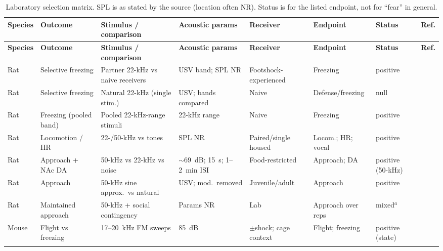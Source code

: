 \begin{landscape}
\begingroup
\footnotesize
\singlespacing
\setlength{\tabcolsep}{3pt}
\begin{longtable}{@{}p{0.85in}p{0.75in}p{1.35in}p{1.1in}p{0.95in}p{0.85in}p{0.55in}p{0.7in}@{}}
\caption{Laboratory selection matrix. SPL is as stated by the source (location often NR). Status is for the listed endpoint, not for ``fear'' in general.}\label{tab:practical-lab}\\
\toprule
\textbf{Species} & \textbf{Outcome} & \textbf{Stimulus / comparison} & \textbf{Acoustic params} & \textbf{Receiver} & \textbf{Endpoint} & \textbf{Status} & \textbf{Ref.} \\
\midrule
\endfirsthead
\toprule
\textbf{Species} & \textbf{Outcome} & \textbf{Stimulus / comparison} & \textbf{Acoustic params} & \textbf{Receiver} & \textbf{Endpoint} & \textbf{Status} & \textbf{Ref.} \\
\midrule
\endhead
\bottomrule
\endlastfoot
Rat & Selective freezing & Partner 22-kHz vs naive receivers & USV band; SPL NR & Footshock-experienced & Freezing & positive & \citet{KimEtAl2010} \\ \addlinespace[2pt]
Rat & Selective freezing & Natural 22-kHz (single stim.) & USV; bands compared & Naive & Defense/freezing & null & \citet{EndresEtAl2007} \\ \addlinespace[2pt]
Rat & Freezing (pooled band) & Pooled 22-kHz-range stimuli & 22-kHz range & Naive & Freezing & positive & \citet{EndresEtAl2007} \\ \addlinespace[2pt]
Rat & Locomotion / HR & 22-/50-kHz vs tones & SPL NR & Paired/single housed & Locom.; HR; vocal & positive & \citet{OlszynskiEtAl2020} \\ \addlinespace[2pt]
Rat & Approach + NAc DA & 50-kHz vs 22-kHz vs noise & $\sim$69~dB; 15~s; 1--2~min ISI & Food-restricted & Approach; DA & positive (50-kHz) & \citet{WilluhnEtAl2014} \\ \addlinespace[2pt]
Rat & Approach & 50-kHz sine approx.\ vs natural & USV; mod.\ removed & Juvenile/adult & Approach & positive & \citet{WohrSchwarting2007} \\ \addlinespace[2pt]
Rat & Maintained approach & 50-kHz + social contingency & Params NR & Lab & Approach over reps & mixed$^{a}$ & \citet{BerzEtAl2022} \\ \addlinespace[2pt]
Mouse & Flight vs freezing & 17--20~kHz FM sweeps & 85~dB & $\pm$shock; cage context & Flight; freezing & positive (state) & \citet{MongeauEtAl2003} \\ \addlinespace[2pt]

\end{longtable}
\end{landscape}
